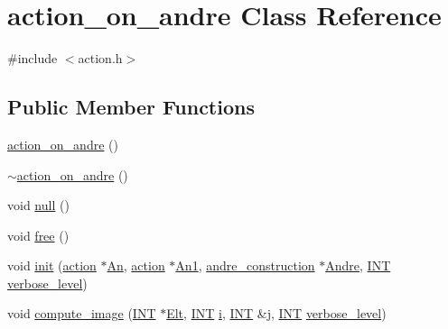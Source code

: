 \hypertarget{classaction__on__andre}{}\section{action\+\_\+on\+\_\+andre Class Reference}
\label{classaction__on__andre}


{\ttfamily \#include $<$action.\+h$>$}

\subsection*{Public Member Functions}
\begin{DoxyCompactItemize}
\item 
\mbox{\hyperlink{classaction__on__andre_a59d9a206f42618a0a5038a3e2bf25c77}{action\+\_\+on\+\_\+andre}} ()
\item 
\mbox{\hyperlink{classaction__on__andre_a6e3c9bfe69fb9270796172ddb152efac}{$\sim$action\+\_\+on\+\_\+andre}} ()
\item 
void \mbox{\hyperlink{classaction__on__andre_a385e251423cfefdfb7bfeda57be64d8b}{null}} ()
\item 
void \mbox{\hyperlink{classaction__on__andre_ade5ab62528466047a3400f34e95f67d8}{free}} ()
\item 
void \mbox{\hyperlink{classaction__on__andre_a4022d93d8462092627dc718a77989daa}{init}} (\mbox{\hyperlink{classaction}{action}} $\ast$\mbox{\hyperlink{classaction__on__andre_abd1366e86cf44d282ad5b0838df1ddd3}{An}}, \mbox{\hyperlink{classaction}{action}} $\ast$\mbox{\hyperlink{classaction__on__andre_a43b7e6b78c24c70a82c301818ce3bca5}{An1}}, \mbox{\hyperlink{classandre__construction}{andre\+\_\+construction}} $\ast$\mbox{\hyperlink{classaction__on__andre_a813bcc8f34aef3ee3294b7d8a9f1b2bc}{Andre}}, \mbox{\hyperlink{galois_8h_a09fddde158a3a20bd2dcadb609de11dc}{I\+NT}} \mbox{\hyperlink{simeon_8_c_a818073fbcc2f439e7c56952f67386122}{verbose\+\_\+level}})
\item 
void \mbox{\hyperlink{classaction__on__andre_afba3b53df76cb927a12e488c790d8e4b}{compute\+\_\+image}} (\mbox{\hyperlink{galois_8h_a09fddde158a3a20bd2dcadb609de11dc}{I\+NT}} $\ast$\mbox{\hyperlink{simeon_8_c_aec1406935bdb1fee3561fcb840964100}{Elt}}, \mbox{\hyperlink{galois_8h_a09fddde158a3a20bd2dcadb609de11dc}{I\+NT}} \mbox{\hyperlink{alphabet2_8_c_acb559820d9ca11295b4500f179ef6392}{i}}, \mbox{\hyperlink{galois_8h_a09fddde158a3a20bd2dcadb609de11dc}{I\+NT}} \&\mbox{\hyperlink{alphabet2_8_c_a37d972ae0b47b9099e30983131d31916}{j}}, \mbox{\hyperlink{galois_8h_a09fddde158a3a20bd2dcadb609de11dc}{I\+NT}} \mbox{\hyperlink{simeon_8_c_a818073fbcc2f439e7c56952f67386122}{verbose\+\_\+level}})

\end{DoxyCompactItemize}
